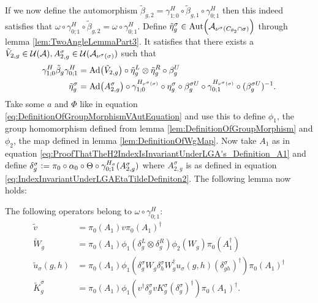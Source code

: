 \documentclass[11pt,a4paper,twoside]{article}
\numberwithin{equation}{section}
\begin{document}
	If we now define the automorphism $\tilde{\beta}_{g,2}=\gamma^{H}_{1;0}\circ\tilde\beta_{g,1}\circ\gamma^{H}_{0;1}$ then this indeed satisfies that $\omega\circ\gamma^{H}_{0;1}\circ\tilde{\beta}_{g,2}=\omega\circ\gamma^{H}_{0;1}$. Define $\tilde\eta_g^\sigma\in\Aut{\AA_{\nu^{\sigma}(C_{\theta_2}\cap\sigma)}}$ through lemma \ref{lem:TwoAngleLemmaPart3}. It satisfies that there exists a $\tilde V_{2,g}\in\mathcal U(\mathcal A),A_{2,g}^{\sigma}\in\mathcal U(\mathcal A_{\nu^\sigma(\sigma)})$ such that
	\begin{align}
		\label{eq:IndexInvariantUnderLGAEtaTildeDefiniton1}
		\gamma^{H}_{1;0}\tilde{\beta}_g\gamma^{H}_{0;1}&=\Ad{\tilde V_{2,g}}\circ\tilde{\eta}_g^L\otimes\tilde{\eta}_g^R\circ\beta_g^U\\
		\label{eq:IndexInvariantUnderLGAEtaTildeDefiniton2}
		\tilde{\eta}_g^\sigma&=\Ad{A_{2,g}^\sigma}\circ\gamma^{H_{\nu^{\sigma}(\sigma)}}_{1;0}\circ\eta_g^\sigma\circ\beta_g^{\sigma U}\circ\gamma^{H_{\nu^{\sigma}(\sigma)}}_{0;1}\circ(\beta_g^{\sigma U})^{-1}.
	\end{align}
	Take some $a$ and $\Phi$ like in equation \eqref{eq:DefinitionOfGroupMorphismVAutEquation} and use this to define $\phi_1$, the group homomorphism defined from lemma \ref{lem:DefinitionOfGroupMorphism} and $\phi_2$, the map defined in lemma \ref{lem:DefinitionOfWgMap}. Now take $A_1$ as in equation \eqref{eq:ProofThatTheH2IndexIsInvariantUnderLGA's_Definition_A1} and define $\delta_g^\sigma\vcentcolon= \pi_0\circ\alpha_0\circ\Theta\circ\gamma^{H_\sigma}_{0;1}(A^\sigma_{2,g})$ where $A^\sigma_{2,g}$ is as defined in equation \eqref{eq:IndexInvariantUnderLGAEtaTildeDefiniton2}. The following lemma now holds:
	\begin{lemma}\label{lem:OperatorsBelongingToOmegaAfterH}
		The following operators belong to $\omega\circ\gamma^{H}_{0;1}:$
		\begin{align}
			\label{eq:IndexInvariantUnderLGANewOperator1}
			\tilde{v}&=\pi_0(A_1)v\pi_0(A_1)^\dagger\\
			\label{eq:IndexInvariantUnderLGANewOperator2}
			\tilde{W}_g&=\pi_0(A_1)\phi_1(\delta^L_g\otimes\delta^R_g)\phi_2( W_g)\pi_0(A_1^\dagger)\\
			\label{eq:IndexInvariantUnderLGANewOperator3}
			\tilde u_\sigma(g,h)&=\pi_0(A_1) \phi_1\left(\delta^\sigma_g W_g\delta^\sigma_h W_g^\dagger u_\sigma(g,h)(\delta^\sigma_{gh})^\dagger\right)\pi_0(A_1)^\dagger\\
			\label{eq:IndexInvariantUnderLGANewOperator4}
			\tilde{K}_g^\sigma&=\pi_0(A_1)\phi_1(v^\dagger \delta_g^\sigma v K_g^\sigma (\delta_g^\sigma)^\dagger) \pi_0(A_1)^\dagger.
		\end{align}
	\end{lemma}
\end{document}
